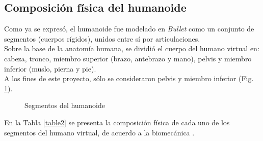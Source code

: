 \documentclass{article}
\begin{document}
\subsection{Composici\'on f\'isica del humanoide}
Como ya se expres\'o, el humanoide fue modelado en \textit{Bullet} como un conjunto de segmentos (cuerpos r\'igidos), unidos entre s\'i por articulaciones. \\
Sobre la base de la anatom\'ia humana, se dividi\'o el cuerpo del humano virtual en: cabeza, tronco, miembro superior (brazo, antebrazo y mano), pelvis y miembro inferior (muslo, pierna y pie). \\
A los fines de este proyecto, s\'olo se consideraron pelvis y miembro inferior (Fig. \ref{fig:humanoid_segments}).
\begin{figure}[H]%
  \centering
    \caption{Segmentos del humanoide}
    \label{fig:humanoid_segments}
\end{figure} 
\noindent En la Tabla \ref{table2} se presenta la composici\'on f\'isica de cada uno de los segmentos del humano virtual, de acuerdo a la biomec\'anica \cite{biomechanics}.
\begin {table}[H]
	\begin{center}
		\caption{Composici\'on f\'isica de cada segmento del humanoide}
		\label{table2}
	\end{center}
\end{table}
\end{document}
